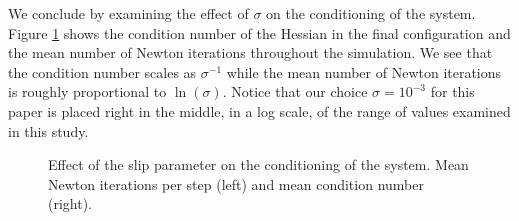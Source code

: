 We conclude by examining the effect of $\sigma$ on the conditioning of the
system. Figure \ref{fig:clutter_sigma} shows the condition number of the Hessian
in the final configuration and the mean number of Newton iterations throughout
the simulation. We see that the condition number scales as $\sigma^{-1}$ while
the mean number of Newton iterations is roughly proportional to  $\ln(\sigma)$.
Notice that our choice $\sigma=10^{-3}$ for this paper is placed right in the
middle, in a log scale, of the range of values examined in this study.
\begin{figure}[!h]
	\centering
	\caption{\label{fig:clutter_sigma} 
	Effect of the slip parameter on the conditioning of the system. Mean Newton iterations per step (left) and mean condition number (right).}
\end{figure}

    